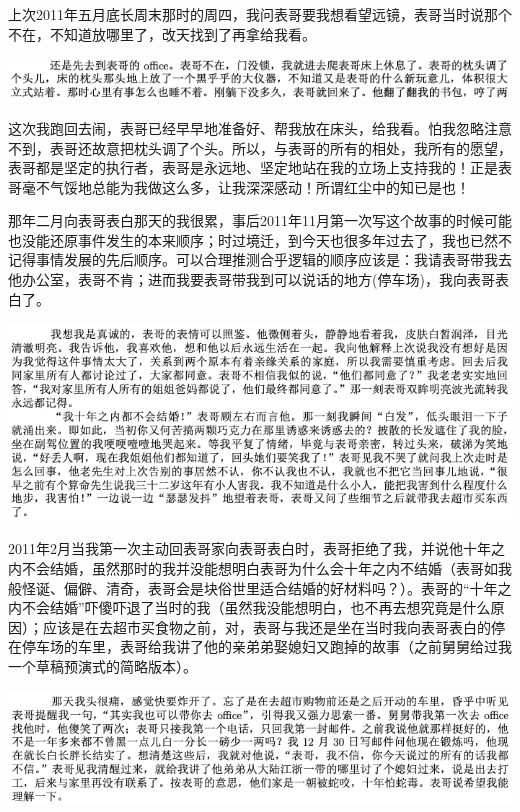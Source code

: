 \documentclass[9pt, b5paper]{article}
\begin{document}
上次2011年五月底长周末那时的周四，我问表哥要我想看望远镜，表哥当时说那个不在，不知道放哪里了，改天找到了再拿给我看。 

\begin{center}
\includegraphics[width=.9\linewidth]{./pic/p1p67-7.png}
\end{center}

这次我跑回去闹，表哥已经早早地准备好、帮我放在床头，给我看。怕我忽略注意不到，表哥还故意把枕头调了个头。所以，与表哥的所有的相处，我所有的愿望，表哥都是坚定的执行者，表哥是永远地、坚定地站在我的立场上支持我的！正是表哥毫不气馁地总能为我做这么多，让我深深感动！所谓红尘中的知已是也！

那年二月向表哥表白那天的我很累，事后2011年11月第一次写这个故事的时候可能也没能还原事件发生的本来顺序；时过境迁，到今天也很多年过去了，我也已然不记得事情发展的先后顺序。可以合理推测合乎逻辑的顺序应该是：我请表哥带我去他办公室，表哥不肯；进而我要表哥带我到可以说话的地方(停车场)，我向表哥表白了。

\begin{center}
\includegraphics[width=.9\linewidth]{./pic/p1p50-3.png}
\end{center}

2011年2月当我第一次主动回表哥家向表哥表白时，表哥拒绝了我，并说他十年之内不会结婚，虽然那时的我并没能想明白表哥为什么会十年之内不结婚（表哥如我般怪诞、偏僻、清奇，表哥会是块俗世里适合结婚的好材料吗？）。表哥的“十年之内不会结婚”吓傻吓退了当时的我（虽然我没能想明白，也不再去想究竟是什么原因）；应该是在去超市买食物之前，对，表哥与我还是坐在当时我向表哥表白的停在停车场的车里，表哥给我讲了他的亲弟弟娶媳妇又跑掉的故事（之前舅舅给过我一个草稿预演式的简略版本）。

\begin{center}
\includegraphics[width=.9\linewidth]{./pic/p1p50-4.png}
\end{center}
\end{document}
